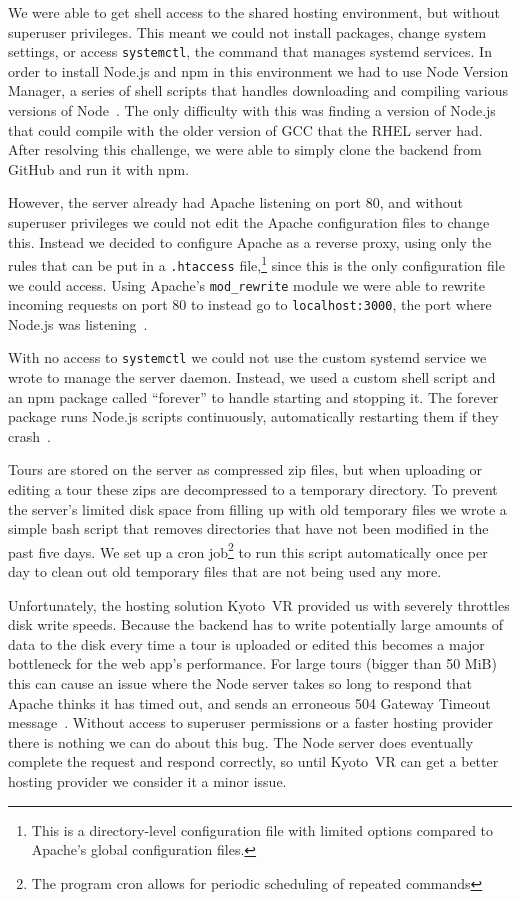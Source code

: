 \documentclass[a4paper, 10pt, american, titlepage]{article}
\begin{document}
We were able to get shell access to the shared hosting environment, but without
superuser privileges. This meant we could not install packages, change system
settings, or access \texttt{systemctl}, the command that manages systemd
services. In order to install Node.js and npm in this environment we had to use
Node Version Manager, a series of shell scripts that handles downloading and
compiling various versions of Node~\autocite{nvmsh2019}.  The only difficulty
with this was finding a version of Node.js that could compile with the older
version of GCC that the RHEL server had. After resolving this challenge, we were
able to simply clone the backend from GitHub and run it with npm.

However, the server already had Apache listening on port 80, and without
superuser privileges we could not edit the Apache configuration files to change
this. Instead we decided to configure Apache as a reverse proxy, using only the
rules that can be put in a \texttt{.htaccess} file,\footnote{This is a
directory-level configuration file with limited options compared to Apache's
global configuration files.} since this is the only configuration file we could
access. Using Apache's \texttt{mod\_rewrite} module we were able to rewrite
incoming requests on port 80 to instead go to \texttt{localhost:3000}, the port
where Node.js was listening~\autocite{apache2019}.

With no access to \texttt{systemctl} we could not use the custom systemd service
we wrote to manage the server daemon. Instead, we used a custom shell script and
an npm package called ``forever'' to handle starting and stopping it. The
forever package runs Node.js scripts continuously, automatically restarting them
if they crash~\autocite{robbins2019}.

Tours are stored on the server as compressed zip files, but when uploading or
editing a tour these zips are decompressed to a temporary directory. To prevent
the server's limited disk space from filling up with old temporary files we
wrote a simple bash script that removes directories that have not been modified
in the past five days. We set up a cron job\footnote{The program cron allows for
periodic scheduling of repeated commands} to run this script automatically once
per day to clean out old temporary files that are not being used any more.

Unfortunately, the hosting solution Kyoto~VR provided us with severely throttles
disk write speeds. Because the backend has to write potentially large amounts of
data to the disk every time a tour is uploaded or edited this becomes a major
bottleneck for the web app's performance. For large tours (bigger than 50 MiB)
this can cause an issue where the Node server takes so long to respond that
Apache thinks it has timed out, and sends an erroneous 504 Gateway Timeout
message~\autocite{rfc7231}. Without access to superuser permissions or a faster
hosting provider there is nothing we can do about this bug. The Node server does
eventually complete the request and respond correctly, so until Kyoto~VR can get
a better hosting provider we consider it a minor issue.
\end{document}
